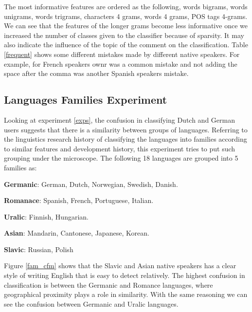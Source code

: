 \documentclass[10pt,a5paper,twoside]{article}
\begin{document}
The most informative features are ordered as the following, words bigrams, words
unigrams, words trigrams, characters 4 grams, words 4 grams, POS tags 4-grams.
We can see that the features of the longer grams become less informative once we
increased the number of classes given to the classifier because of sparsity.
It may also indicate the influence of the topic of the comment on the
classification. Table \ref{frequent} shows some different mistakes made by
different native speakers. For example, for French speakers ownr was a common
mistake and not adding the space after the comma was another Spanish speakers
mistake.

\subsection{Languages Families Experiment}

Looking at experiment \ref{exps}, the confusion in classifying Dutch and German
users suggests that there is a similarity between groups of languages. Referring
to the linguistics research history of classifying the languages into families
according to similar features and development history, this experiment tries to
put such grouping under the microscope. The following 18 languages are grouped into 5 families as:
\begin{compactitem}
\item \textbf{Germanic}: German, Dutch, Norwegian, Swedish, Danish.
\item \textbf{Romanace}: Spanish, French, Portuguese, Italian.
\item \textbf{Uralic}: Finnish, Hungarian.
\item \textbf{Asian}: Mandarin, Cantonese, Japanese, Korean.
\item \textbf{Slavic}: Russian, Polish
\end{compactitem}

Figure \ref{fam_cfm} shows that the Slavic and Asian native speakers has a clear style of writing English that is easy to detect relatively. The highest confusion in classification is between the Germanic and Romance languages, where geographical proximity plays a role in similarity. With the same reasoning we can see the confusion between Germanic and Uralic languages.
\end{document}
